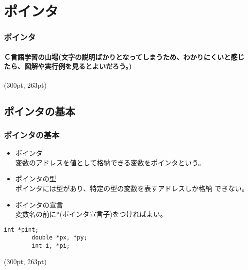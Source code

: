 \documentclass[dvipdfmx]{beamer}
\begin{document}
\section{ポインタ}
\begin{frame}[t]
    \frametitle{ポインタ}
    \framesubtitle{\textrm{Ｃ}言語学習の山場(文字の説明ばかりとなってしまうため、わかりにくいと感じたら、図解や実行例を見るとよいだろう。)}
    \tableofcontents[sections={2, 12}]
    \begin{textblock*}{0.3\linewidth}(300pt, 263pt)
        \space
    \end{textblock*}
\end{frame}

\subsection{ポインタの基本}
\begin{frame}[t, fragile]
    \frametitle{ポインタの基本}
    \begin{itemize}
        \item ポインタ\\
            変数のアドレスを値として格納できる変数をポインタという。
        \item ポインタの型\\
            ポインタには型があり、特定の型の変数を表すアドレスしか格納
            できない。
        \item ポインタの宣言\\
            変数名の前に*(ポインタ宣言子)をつければよい。
    \end{itemize}
    \begin{lstlisting}[gobble=8, caption=Example\space of\space Pointer\space Declaration]
        int *pint;
        double *px, *py;
        int i, *pi;
    \end{lstlisting}
    \begin{textblock*}{0.3\linewidth}(300pt, 263pt)
        \space
    \end{textblock*}
\end{frame}
\end{document}
